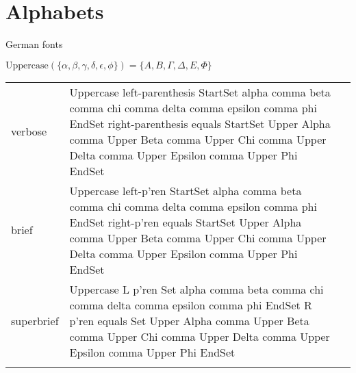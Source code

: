 \section{Alphabets}

\R
German fonts


\R
\E $\mathrm{Uppercase}(\{\alpha,\beta,\gamma,\delta,\epsilon,\phi\}) = \{A,B,\Gamma,\Delta,E,\Phi\}$
\begin{longtable}[c]{@{}lll@{}}
\toprule\addlinespace
verbose & Uppercase left-parenthesis StartSet alpha comma beta comma chi
comma delta comma epsilon comma phi EndSet right-parenthesis equals
StartSet Upper Alpha comma Upper Beta comma Upper Chi comma Upper Delta
comma Upper Epsilon comma Upper Phi EndSet &

\\\addlinespace
brief & Uppercase left-p'ren StartSet alpha comma beta comma chi comma
delta comma epsilon comma phi EndSet right-p'ren equals StartSet Upper
Alpha comma Upper Beta comma Upper Chi comma Upper Delta comma Upper
Epsilon comma Upper Phi EndSet &

\\\addlinespace
superbrief & Uppercase L p'ren Set alpha comma beta comma chi comma
delta comma epsilon comma phi EndSet R p'ren equals Set Upper Alpha
comma Upper Beta comma Upper Chi comma Upper Delta comma Upper Epsilon
comma Upper Phi EndSet &

\\\addlinespace
\bottomrule
\end{longtable}


